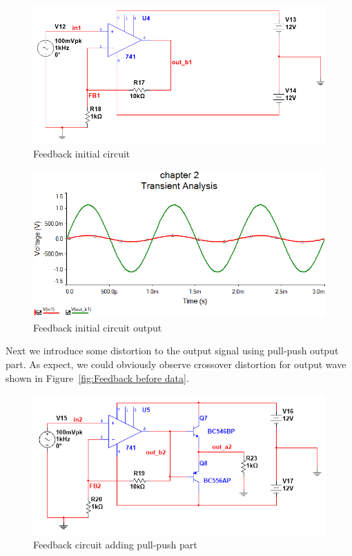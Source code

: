 \begin{figure}[htbp]
	\centering
	\includegraphics[scale=0.65]{"../Photo/Chap2/Feed_back_ini"}
	\caption{Feedback initial circuit  }
	\label{fig:Feedback init}
\end{figure}

\begin{figure}[htbp]
	\centering
	\includegraphics[scale=0.7]{"../Photo/Chap2/Feedback_ini_data"}
	\caption{Feedback initial circuit output}
	\label{fig:Feedback init data}
\end{figure}

Next we introduce some distortion to the output signal using  pull-push output part. As expect, we could obviously observe crossover distortion for output wave shown in Figure~\ref{fig:Feedback before data}.

\begin{figure}[htbp]
	\centering
	\includegraphics[scale=0.7]{"../Photo/Chap2/Feed_back_ini_before"}
	\caption{Feedback circuit adding pull-push part}
	\label{fig:Feedback before}
\end{figure}

